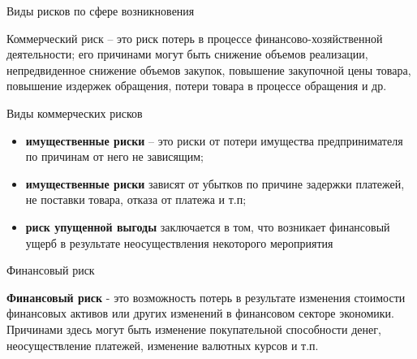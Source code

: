 \documentclass[financial_risks_lectures.tex]{subfiles}
\begin{document}
\begin{frame}[shrink=15]{Виды рисков по сфере возникновения}
\begin{block}{Коммерческий риск}
\quad– это риск потерь в процессе финансово-хозяйственной деятельности; его причинами могут быть снижение объемов реализации, непредвиденное снижение объемов закупок, повышение закупочной цены товара, повышение издержек обращения, потери товара в процессе обращения и др.
\end{block}
Виды коммерческих рисков
\begin{itemize}
\item
\textbf{имущественные риски }– это риски от потери имущества предпринимателя по причинам от него не зависящим;
\item
\textbf{имущественные риски }зависят от убытков по причине задержки платежей, не поставки товара, отказа от платежа и т.п;
\item
\textbf{риск упущенной выгоды }заключается в том, что возникает финансовый ущерб в результате неосуществления некоторого мероприятия
\end{itemize}
\end{frame}

\begin{frame}{Финансовый риск}
\begin{block}{\textbf{Финансовый риск}}
\quad - это возможность потерь в результате изменения стоимости финансовых активов или других изменений в финансовом секторе экономики. Причинами здесь могут быть изменение покупательной способности денег, неосуществление платежей, изменение валютных курсов и т.п.
\end{block}
\end{frame}
\end{document}
